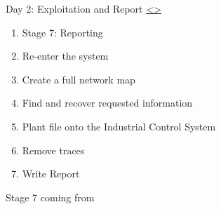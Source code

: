 \documentclass[12pt]{extarticle}
\newenvironment{instructionblock}{\Large\bgroup}{\egroup}
\newcounter{next}
\newcounter{prev}
\begin{document}
\pagebreak
{}
\begin{slide}{Day 2: Exploitation and Report}
{\hyperref[slide \theprev]{\textless}\hyperref[slide \thenext]{\textgreater}}
	\begin{instructionblock}
		\begin{enumerate}
        	\item Stage 7: Reporting
			\item Re-enter the system
            \item Create a full network map
            \item Find and recover requested information
            \item Plant file onto the Industrial Control System
            \item Remove traces
           	\item Write Report
		\end{enumerate}
        \vspace{-.1in}
        \begin{small}
        	Stage 7 coming from\cite[Chapter 0]{Ref:Weidman}
        \end{small}
	\end{instructionblock}
\end{slide}
\end{document}
